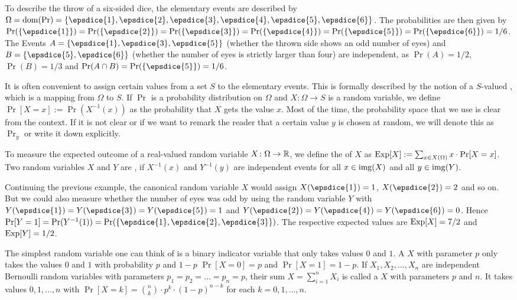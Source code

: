 \begin{example}
  To describe the throw of a six-sided dice, the elementary events are
  described by
  $\Omega=\dom(\Pr)=\{\epsdice{1},\epsdice{2},\epsdice{3},\epsdice{4},\epsdice{5},\epsdice{6}\}$. The
  probabilities are then given by
  $\Pr(\{\epsdice{1}\})=\Pr(\{\epsdice{2}\})=\Pr(\{\epsdice{3}\})=\Pr(\{\epsdice{4}\})=\Pr(\{\epsdice{5}\})=\Pr(\{\epsdice{6}\})=1/6$. The
  Events $A=\{\epsdice{1},\epsdice{3},\epsdice{5}\}$ (whether the thrown
  side shows an odd number of eyes) and $B=\{\epsdice{5},\epsdice{6}\}$
  (whether the number of eyes is strictly larger than four) are
  independent, as $\Pr(A)=1/2$, $\Pr(B)=1/3$ and
  $\Pr(A\cap B)=\Pr(\{\epsdice{5}\})=1/6$. 
\end{example}

It is often convenient to assign certain values from a set $S$ to the elementary
events. This is formally described by the notion of a
$S$-valued , which is a mapping from $\Omega$
to $S$. If $\Pr$ is a probability distribution on $\Omega$ and $X\colon
\Omega\to S$ is a random variable, we define $\Pr[X=x] :=
\Pr(X^{-1}(x))$ as the probability that $X$ gets the value $x$. Most of
the time, the probability space that we use is clear from the
context. If it is not clear or if we want to remark the reader that a
certain value $y$ is chosen at random, we will denote this as $\Pr_{y}$
or write it down explicitly.


To measure the expected outcome of a real-valued random variable
$X\colon \Omega\to \mathbb{R}$, we define the  of $X$
as $\operatorname{Exp}[X] := \sum_{x\in X(\Omega)}x\cdot \Pr[X=x]$. Two random
variables $X$ and $Y$ are , if
$X^{-1}(x)$ and $Y^{-1}(y)$ are independent events for all
$x\in \operatorname{img}(X)$ and all $y\in \operatorname{img}(Y)$.
\begin{example}
  Continuing the previous example, the canonical random variable $X$
  would assign $X(\epsdice{1})=1$, $X(\epsdice{2})=2$ and so on. But we
  could also measure whether the number of eyes was odd by using the
  random variable $Y$ with
  $Y(\epsdice{1})=Y(\epsdice{3})=Y(\epsdice{5})=1$ and
  $Y(\epsdice{2})=Y(\epsdice{4})=Y(\epsdice{6})=0$. Hence
  $\Pr[Y=1]=\Pr(Y^{-1}(1))=\Pr(\{\epsdice{1},\epsdice{2},\epsdice{3}\})$.
  The respective expected values are $\operatorname{Exp}[X]=7/2$ and $\operatorname{Exp}[Y]=1/2$.
\end{example}


The simplest random variable one can think of is a binary indicator
variable that only takes values $0$ and $1$. A  $X$ with parameter $p$ only takes the values $0$ and $1$
with probability $p$ and $1-p$ \ie $\Pr[X=0]=p$ and $\Pr[X=1]=1-p$. If
$X_{1},X_{2},\ldots,X_{n}$ are independent Bernoulli random variables
with parameters $p_{1}=p_{2}=\ldots=p_{n}=p$, their sum
$X=\sum_{i=1}^{n}X_{i}$ is called a  $X$
with parameters $p$ and $n$. It takes values $0,1,\ldots,n$ with
$\Pr[X=k]=\binom{n}{k}\cdot p^{k}\cdot (1-p)^{n-k}$ for each
$k=0,1,\ldots,n$. 

